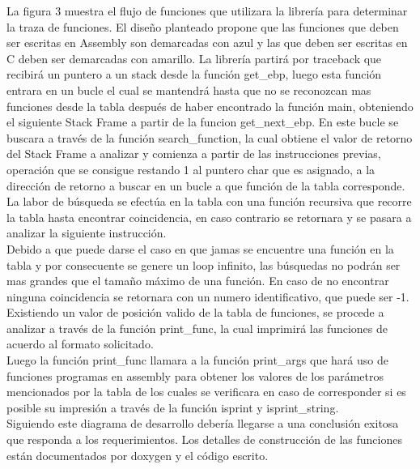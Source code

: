 \documentclass[twocolumn,11pts]{IEEEtran}
\begin{document}
La figura 3 muestra el flujo de funciones que utilizara la librería para determinar la traza de funciones. El diseño planteado propone que las funciones que deben ser escritas en Assembly son demarcadas con azul y las que deben ser escritas en C deben ser demarcadas con amarillo. La librería partirá por traceback que recibirá un puntero a un stack desde la función get\_ebp, luego esta función entrara en un bucle el cual se mantendrá hasta que no se reconozcan mas funciones desde la tabla después de haber encontrado la función main, obteniendo el siguiente Stack Frame a partir de la funcion get\_next\_ebp. En este bucle se buscara a través de la función search\_function, la cual obtiene el valor de retorno del Stack Frame a analizar y comienza a partir de las instrucciones previas, operación que se consigue restando 1 al puntero char que es asignado, a la dirección de retorno a buscar en un bucle a que función de la tabla corresponde. La labor de búsqueda se efectúa en la tabla con una función recursiva que recorre la tabla hasta encontrar coincidencia, en caso contrario se retornara y se pasara a analizar la siguiente instrucción. \\
Debido a que puede darse el caso en que jamas se encuentre una función en la tabla y por consecuente se genere un loop infinito, las búsquedas no podrán ser mas grandes que el tamaño máximo de una función. En caso de no encontrar ninguna coincidencia se retornara con un numero identificativo, que puede ser -1.
Existiendo un valor de posición valido de la tabla de funciones, se procede a analizar a través de la función print\_func, la cual imprimirá las funciones de acuerdo al formato solicitado.\\
Luego la función print\_func llamara a la función print\_args que hará uso de funciones programas en assembly para obtener los valores de los parámetros mencionados por la tabla de los cuales se verificara en caso de corresponder si es posible su impresión a través de la función isprint y isprint\_string.\\
Siguiendo este diagrama de desarrollo debería llegarse a una conclusión exitosa que responda a los requerimientos. Los detalles de construcción de las funciones están documentados por doxygen y el código escrito.
\end{document}

